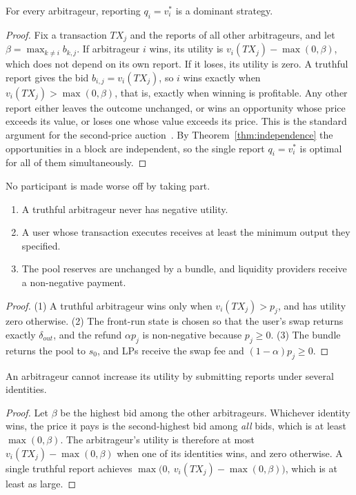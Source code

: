 \begin{theorem}
\label{thm:ic}
For every arbitrageur, reporting $q_i=v_i^{*}$ is a dominant strategy.
\end{theorem}
\begin{proof}
Fix a transaction $TX_j$ and the reports of all other arbitrageurs, and let $\beta=\max_{k\neq i}b_{k,j}$. If arbitrageur $i$ wins, its utility is $v_i(TX_j)-\max(0,\beta)$, which does not depend on its own report. If it loses, its utility is zero. A truthful report gives the bid $b_{i,j}=v_i(TX_j)$, so $i$ wins exactly when $v_i(TX_j)>\max(0,\beta)$, that is, exactly when winning is profitable. Any other report either leaves the outcome unchanged, or wins an opportunity whose price exceeds its value, or loses one whose value exceeds its price. This is the standard argument for the second-price auction~\cite{vickrey1961counterspeculation}. By Theorem~\ref{thm:independence} the opportunities in a block are independent, so the single report $q_i=v_i^{*}$ is optimal for all of them simultaneously.
\end{proof}

\begin{theorem}
\label{thm:ir}
No participant is made worse off by taking part.
\begin{enumerate}
    \item A truthful arbitrageur never has negative utility.
    \item A user whose transaction executes receives at least the minimum output they specified.
    \item The pool reserves are unchanged by a bundle, and liquidity providers receive a non-negative payment.
\end{enumerate}
\end{theorem}
\begin{proof}
(1) A truthful arbitrageur wins only when $v_i(TX_j)>p_j$, and has utility zero otherwise. (2) The front-run state is chosen so that the user's swap returns exactly $\delta_{out}$, and the refund $\alpha p_j$ is non-negative because $p_j\geq 0$. (3) The bundle returns the pool to $s_0$, and LPs receive the swap fee and $(1-\alpha)p_j\geq 0$.
\end{proof}

\begin{theorem}
\label{thm:sybil}
An arbitrageur cannot increase its utility by submitting reports under several identities.
\end{theorem}
\begin{proof}
Let $\beta$ be the highest bid among the other arbitrageurs. Whichever identity wins, the price it pays is the second-highest bid among \emph{all} bids, which is at least $\max(0,\beta)$. The arbitrageur's utility is therefore at most $v_i(TX_j)-\max(0,\beta)$ when one of its identities wins, and zero otherwise. A single truthful report achieves $\max\bigl(0,\ v_i(TX_j)-\max(0,\beta)\bigr)$, which is at least as large.
\end{proof}

